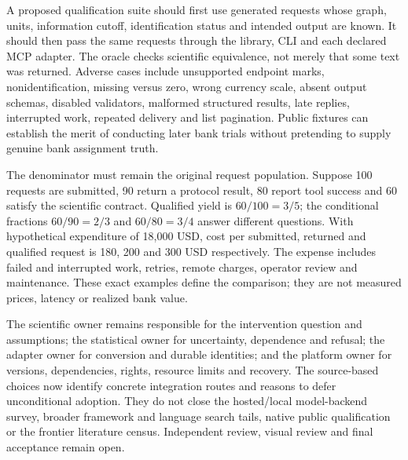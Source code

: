A proposed qualification suite should first use generated requests whose
graph, units, information cutoff, identification status and intended output
are known. It should then pass the same requests through the library, CLI
and each declared MCP adapter. The oracle checks scientific equivalence,
not merely that some text was returned. Adverse cases include unsupported
endpoint marks, nonidentification, missing versus zero, wrong currency scale,
absent output schemas, disabled validators, malformed structured results,
late replies, interrupted work, repeated delivery and list pagination.
Public fixtures can establish the merit of conducting later bank trials
without pretending to supply genuine bank assignment truth.
\citep{exec24_mcp_contracts}

The denominator must remain the original request population. Suppose 100
requests are submitted, 90 return a protocol result, 80 report tool success
and 60 satisfy the scientific contract. Qualified yield is $60/100=3/5$;
the conditional fractions $60/90=2/3$ and $60/80=3/4$ answer different
questions. With hypothetical expenditure of 18,000 USD, cost per submitted,
returned and qualified request is 180, 200 and 300 USD respectively. The
expense includes failed and interrupted work, retries, remote charges,
operator review and maintenance. These exact examples define the comparison;
they are not measured prices, latency or realized bank value.
\citep{exec24_mcp_contracts}

The scientific owner remains responsible for the intervention question and
assumptions; the statistical owner for uncertainty, dependence and refusal;
the adapter owner for conversion and durable identities; and the platform
owner for versions, dependencies, rights, resource limits and recovery.
The source-based choices now identify concrete integration routes and
reasons to defer unconditional adoption. They do not close the hosted/local
model-backend survey, broader framework and language search tails, native
public qualification or the frontier literature census. Independent review,
visual review and final acceptance remain open.
\citep{exec24_mcp_contracts}

